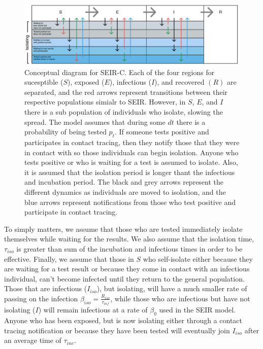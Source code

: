 \documentclass[notitlepage, superscriptaddress]{revtex4-2}
\begin{document}
\begin{figure}
\centering
\includegraphics[width=7in]{SEIR-C_diagram.png}
\caption{\label{f:SEIR-C}
 Conceptual diagram for SEIR-C. Each of the four regions for sucesptible ($S$), exposed ($E$), infectious ($I$), and recovered $(R)$ are separated, and the red arrows represent transitions between their respective populations simialr to SEIR. However, in $S$, $E$, and $I$ there is a sub population of individuals who isolate, slowing the spread. The model assumes that during some $dt$ there is a probability of being tested $p_t$. If someone tests positive and participates in contact tracing, then they notify those that they were in contact with so those individuals can begin isolation. Anyone who tests positive or who is waiting for a test is assumed to isolate. Also, it is assumed that the isolation period is longer thant the infectious and incubation period. The black and grey arrows represent the different dynamics as individuals are moved to isolation, and the blue arrows represent notifications from those who test positive and participate in contact tracing.}
\end{figure}

To simply matters, we assume that those who are tested immediately isolate themselves while waiting for the results. We also assume that the isolation time, $\tau_{iso}$ is greater than sum of the incubation and infectious times in order to be effective. Finally, we assume that those in $S$ who self-isolate either because they are waiting for a test result or because they come in contact with an infectious individual, can't become infected until they return to the general population. Those that are infectious ($I_{iso}$), but isolating, will have a much smaller rate of passing on the infection $\beta_{iso} = \frac{R_{iso}}{\tau_{inf}}$, while those who are infectious but have not isolating ($I$) will remain infectious at a rate of $\beta_{0}$ used in the SEIR model. Anyone who has been exposed, but is now isolating either through a contact tracing notification or because they have been tested will eventually join $I_{iso}$ after an average time of $\tau_{inc}$. 
\end{document}
